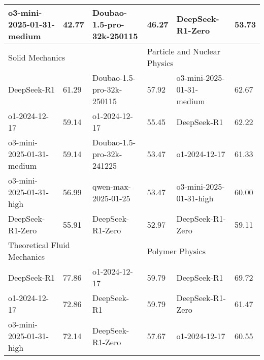 {\begin{longtable}{p{4.2cm}>{\centering\arraybackslash} p{0.8cm}|p{4.2cm} >{\centering\arraybackslash} p{0.8cm}|p{4.2cm} >{\centering\arraybackslash} p{0.8cm}}
\cellcolor{blue!5} o3-mini-2025-01-31-medium & \cellcolor{blue!2}42.77 & \cellcolor{yellow!5} Doubao-1.5-pro-32k-250115 & \cellcolor{yellow!2} 46.27 & \cellcolor{green!5} DeepSeek-R1-Zero & \cellcolor{green!2} 53.73\\
\hline
\multicolumn{2}{p{5.15cm}|}{\cellcolor{blue!10} \centering Solid Mechanics} & \multicolumn{2}{p{5.15cm}|}{\cellcolor{yellow!10} \centering Internal Medicine} & \multicolumn{2}{p{5.15cm}}{\cellcolor{green!10} \centering Particle and Nuclear Physics}\\
\hline
\cellcolor{blue!5} DeepSeek-R1 & \cellcolor{blue!2}61.29 & \cellcolor{yellow!5} Doubao-1.5-pro-32k-250115 & \cellcolor{yellow!2} 57.92 & \cellcolor{green!5} o3-mini-2025-01-31-medium & \cellcolor{green!2} 62.67\\
\cellcolor{blue!5} o1-2024-12-17 & \cellcolor{blue!2}59.14 & \cellcolor{yellow!5} o1-2024-12-17 & \cellcolor{yellow!2} 55.45 & \cellcolor{green!5} DeepSeek-R1 & \cellcolor{green!2} 62.22\\
\cellcolor{blue!5} o3-mini-2025-01-31-medium & \cellcolor{blue!2}59.14 & \cellcolor{yellow!5} Doubao-1.5-pro-32k-241225 & \cellcolor{yellow!2} 53.47 & \cellcolor{green!5} o1-2024-12-17 & \cellcolor{green!2} 61.33\\
\cellcolor{blue!5} o3-mini-2025-01-31-high & \cellcolor{blue!2}56.99 & \cellcolor{yellow!5} qwen-max-2025-01-25 & \cellcolor{yellow!2} 53.47 & \cellcolor{green!5} o3-mini-2025-01-31-high & \cellcolor{green!2} 60.00\\
\cellcolor{blue!5} DeepSeek-R1-Zero & \cellcolor{blue!2}55.91 & \cellcolor{yellow!5} DeepSeek-R1-Zero & \cellcolor{yellow!2} 52.97 & \cellcolor{green!5} DeepSeek-R1-Zero & \cellcolor{green!2} 59.11\\
\hline
\multicolumn{2}{p{5.15cm}|}{\cellcolor{blue!10} \centering Theoretical Fluid Mechanics} & \multicolumn{2}{p{5.15cm}|}{\cellcolor{yellow!10} \centering Neurology} & \multicolumn{2}{p{5.15cm}}{\cellcolor{green!10} \centering Polymer Physics}\\
\hline
\cellcolor{blue!5} DeepSeek-R1 & \cellcolor{blue!2}77.86 & \cellcolor{yellow!5} o1-2024-12-17 & \cellcolor{yellow!2} 59.79 & \cellcolor{green!5} DeepSeek-R1 & \cellcolor{green!2} 69.72\\
\cellcolor{blue!5} o1-2024-12-17 & \cellcolor{blue!2}72.86 & \cellcolor{yellow!5} DeepSeek-R1 & \cellcolor{yellow!2} 59.79 & \cellcolor{green!5} DeepSeek-R1-Zero & \cellcolor{green!2} 61.47\\
\cellcolor{blue!5} o3-mini-2025-01-31-high & \cellcolor{blue!2}72.14 & \cellcolor{yellow!5} DeepSeek-R1-Zero & \cellcolor{yellow!2} 57.67 & \cellcolor{green!5} o1-2024-12-17 & \cellcolor{green!2} 60.55\\

\end{longtable}}
